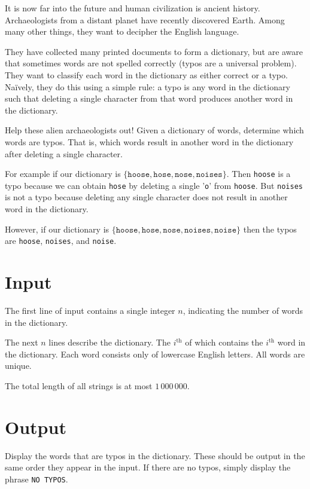 
It is now far into the future and human civilization is ancient history.
Archaeologists from a distant planet have recently discovered Earth. Among many other things,
they want to decipher the English language.

They have collected many printed documents to form a dictionary, but are aware that sometimes
words are not spelled correctly (typos are a universal problem). They want to classify each word
in the dictionary as either correct or a typo. Na\"{i}vely, they do this using a simple rule: a
typo is any word in the dictionary such that deleting a single character from that word produces
another word in the dictionary.

Help these alien archaeologists out! Given a dictionary of words,
determine which words are typos. That is, which words
result in another word in the dictionary after deleting a single character.

For example if our dictionary is $\{\texttt{hoose}, \texttt{hose}, \texttt{nose}, \texttt{noises}\}$.
Then \texttt{hoose} is a typo because we can obtain \texttt{hose} by deleting a single '\texttt{o}' from
\texttt{hoose}. But \texttt{noises} is not a typo because deleting any single character does not result
in another word in the dictionary.

However, if our dictionary is $\{\texttt{hoose}, \texttt{hose}, \texttt{nose}, \texttt{noises}, \texttt{noise}\}$
then the typos are \texttt{hoose}, \texttt{noises}, and \texttt{noise}.

\section*{Input}
The first line of input contains a single integer $n$, indicating the number of words in the dictionary.

The next $n$ lines describe the dictionary. The $i^\textrm{th}$ of which contains the $i^\textrm{th}$ word in the dictionary.
Each word consists only of lowercase English letters. All words are unique.

The total length of all strings is at most $1\,000\,000$.

\section*{Output}
Display the words that are typos in the dictionary. These should be output in the same order 
they appear in the input. If there are no typos, simply display the phrase \texttt{NO TYPOS}.
